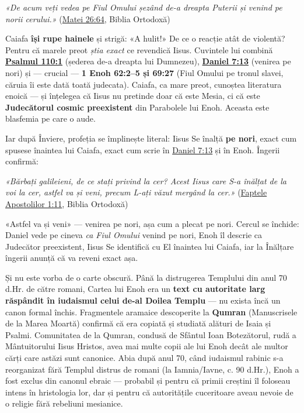 \documentclass[12pt,a4paper,twoside,openany]{book}
\begin{document}
\begin{biblequote}
\textit{«De acum veți vedea pe Fiul Omului șezând de-a dreapta Puterii și venind pe norii cerului.»} (\href{https://bibliaortodoxa.ro/carte.php?id=55\&cap=26\#64}{Matei 26:64}, Biblia Ortodoxă)
\end{biblequote}
Caiafa \textbf{își rupe hainele} și strigă: «A hulit!» De ce o reacție atât de violentă? Pentru că marele preot \textit{știa exact} ce revendică Iisus. Cuvintele lui combină \textbf{\href{https://bibliaortodoxa.ro/carte.php?id=65\&cap=110\#1}{Psalmul 110:1}} (șederea de-a dreapta lui Dumnezeu), \textbf{\href{https://bibliaortodoxa.ro/carte.php?id=16\&cap=7\#13}{Daniel 7:13}} (venirea pe nori) și — crucial — \textbf{1 Enoh 62:2–5 și 69:27} (Fiul Omului pe tronul slavei, căruia îi este dată toată judecata). Caiafa, ca mare preot, cunoștea literatura enoică — și înțelegea că Iisus nu pretinde doar că este Mesia, ci că este \textbf{Judecătorul cosmic preexistent} din Parabolele lui Enoh. Aceasta este blasfemia pe care o aude.

Iar după Înviere, profeția se împlinește literal: Iisus Se înalță \textbf{pe nori}, exact cum spusese înaintea lui Caiafa, exact cum scrie în \href{https://bibliaortodoxa.ro/carte.php?id=16\&cap=7\#13}{Daniel 7:13} și în Enoh. Îngerii confirmă:


\begin{biblequote}
\textit{«Bărbați galileieni, de ce stați privind la cer? Acest Iisus care S-a înălțat de la voi la cer, astfel va și veni, precum L-ați văzut mergând la cer.»} (\href{https://bibliaortodoxa.ro/carte.php?id=26\&cap=1\#11}{Faptele Apostolilor 1:11}, Biblia Ortodoxă)
\end{biblequote}
«Astfel va și veni» — venirea pe nori, așa cum a plecat pe nori. Cercul se închide: Daniel vede pe cineva \textit{ca Fiul Omului} venind pe nori, Enoh îl descrie ca Judecător preexistent, Iisus Se identifică cu El înaintea lui Caiafa, iar la Înălțare îngerii anunță că va reveni exact așa.

Și nu este vorba de o carte obscură. Până la distrugerea Templului din anul 70 d.Hr. de către romani, Cartea lui Enoh era un \textbf{text cu autoritate larg răspândit în iudaismul celui de-al Doilea Templu} — nu exista încă un canon formal închis. Fragmentele aramaice descoperite la \textbf{Qumran} (Manuscrisele de la Marea Moartă) confirmă că era copiată și studiată alături de Isaia și Psalmi. Comunitatea de la Qumran, condusă de Sfântul Ioan Botezătorul, rudă a Mântuitorului Iisus Hristos, avea mai multe copii ale lui Enoh decât ale multor cărți care astăzi sunt canonice. Abia după anul 70, când iudaismul rabinic s-a reorganizat fără Templul distrus de romani (la Iamnia/Iavne, c. 90 d.Hr.), Enoh a fost exclus din canonul ebraic — probabil și pentru că primii creștini îl foloseau intens în hristologia lor, dar și pentru că autoritățile cuceritoare aveau nevoie de o religie fără rebeliuni mesianice.
\end{document}
